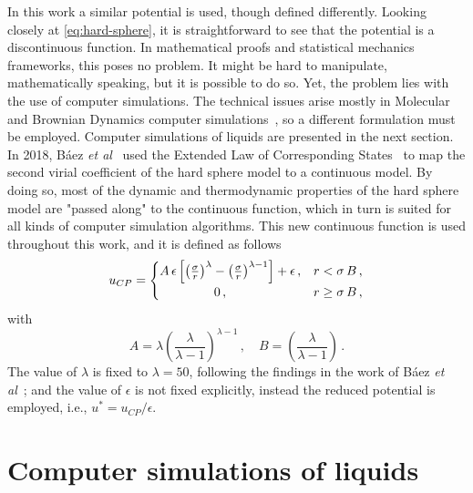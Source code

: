 In this work a similar potential is used, though defined differently. Looking closely
at \autoref{eq:hard-sphere}, it is straightforward to see that the potential is a
discontinuous function. In mathematical proofs and statistical mechanics frameworks,
this poses no problem. It might be hard to manipulate, mathematically speaking,
but it is possible to do so. Yet, the problem lies with the use of computer simulations.
The technical issues arise mostly in Molecular and Brownian Dynamics computer
simulations~\cite{allenComputerSimulationLiquids2017}, so a different formulation
must be employed. Computer simulations of liquids are presented in the next section.
In 2018, Báez \emph{et al}~\cite{baezUsingSecondVirial2018} used the Extended Law
of Corresponding States~\cite{valadez-perezReversibleAggregationColloidal2018}
to map the second virial coefficient of the hard sphere model to a continuous
model. By doing so, most of the dynamic and thermodynamic properties of the hard sphere
model are "passed along" to the continuous function, which in turn is suited for all
kinds of computer simulation algorithms. This new continuous function is used
throughout this work, and it is defined as follows
\begin{equation}
    u_{CP} = 
    \begin{cases}
        A \, \epsilon \left[ {\left(\frac{\sigma}{r}\right)}^{\lambda} -
        {\left(\frac{\sigma}{r}\right)}^{\lambda - 1} \right] + \epsilon \, , 
        &r < \sigma \, B \, , \\
        \hspace{1.5cm} 0 \, , &r \geq \sigma \, B \, ,
    \end{cases}
    \label{eq:cont-hs}
\end{equation}
with
\begin{equation}
    A = \lambda {\left(\frac{\lambda}{\lambda -1}\right)}^{\lambda - 1} \, ,
    \quad
    B = \left(\frac{\lambda}{\lambda -1}\right) \, .
    \label{eq:ab-params}
\end{equation}
The value of $\lambda$ is fixed to $\lambda=50$, following the findings in the work of
Báez \emph{et al}~\cite{baezUsingSecondVirial2018}; and the value of $\epsilon$ is
not fixed explicitly, instead the reduced potential is employed, 
i.e., $u^{*}=u_{CP} / \epsilon$.

\section{Computer simulations of liquids}

